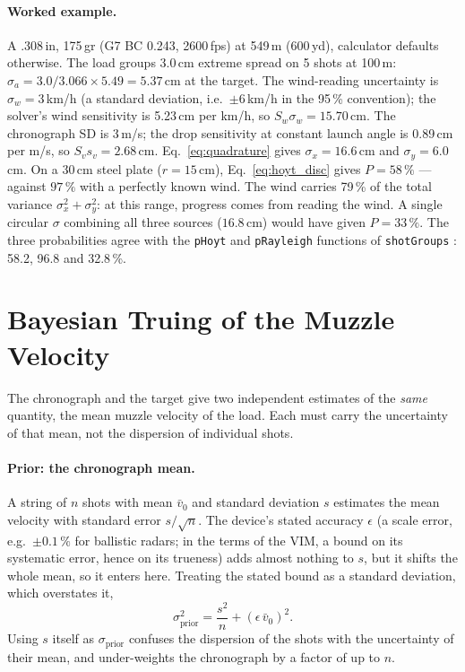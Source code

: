 \documentclass[11pt,twoside,openright]{report}
\begin{document}
\paragraph{Worked example.} A .308\,in, 175\,gr (G7 BC 0.243, 2600\,fps) at 549\,m (600\,yd), calculator defaults otherwise. The load groups 3.0\,cm extreme spread on 5 shots at 100\,m: $\sigma_a = 3.0/3.066 \times 5.49 = 5.37$\,cm at the target. The wind-reading uncertainty is $\sigma_w = 3$\,km/h (a standard deviation, i.e.\ $\pm 6$\,km/h in the 95\,\% convention); the solver's wind sensitivity is 5.23\,cm per km/h, so $S_w\sigma_w = 15.70$\,cm. The chronograph SD is 3\,m/s; the drop sensitivity at constant launch angle is 0.89\,cm per m/s, so $S_v s_v = 2.68$\,cm. Eq.~\eqref{eq:quadrature} gives $\sigma_x = 16.6$\,cm and $\sigma_y = 6.0$\,cm. On a 30\,cm steel plate ($r = 15$\,cm), Eq.~\eqref{eq:hoyt_disc} gives $P = 58\,\%$ --- against $97\,\%$ with a perfectly known wind. The wind carries 79\,\% of the total variance $\sigma_x^2 + \sigma_y^2$: at this range, progress comes from reading the wind. A single circular $\sigma$ combining all three sources ($16.8$\,cm) would have given $P = 33\,\%$. The three probabilities agree with the \texttt{pHoyt} and \texttt{pRayleigh} functions of \texttt{shotGroups} \citep{wollschlaeger_shotgroups}: 58.2, 96.8 and 32.8\,\%.

\section{Bayesian Truing of the Muzzle Velocity}
\label{sec:truing}

The chronograph and the target give two independent estimates of the \emph{same} quantity, the mean muzzle velocity of the load. Each must carry the uncertainty of that mean, not the dispersion of individual shots.

\paragraph{Prior: the chronograph mean.} A string of $n$ shots with mean $\bar{v}_0$ and standard deviation $s$ estimates the mean velocity with standard error $s/\sqrt{n}$. The device's stated accuracy $\epsilon$ (a scale error, e.g.\ $\pm 0.1\,\%$ for ballistic radars; in the terms of the VIM, a bound on its systematic error, hence on its trueness) adds almost nothing to $s$, but it shifts the whole mean, so it enters here. Treating the stated bound as a standard deviation, which overstates it,
\begin{equation}
  \sigma_{\text{prior}}^2 = \frac{s^2}{n} + \left(\epsilon\,\bar{v}_0\right)^2 .
\end{equation}
Using $s$ itself as $\sigma_{\text{prior}}$ confuses the dispersion of the shots with the uncertainty of their mean, and under-weights the chronograph by a factor of up to $n$.
\end{document}
